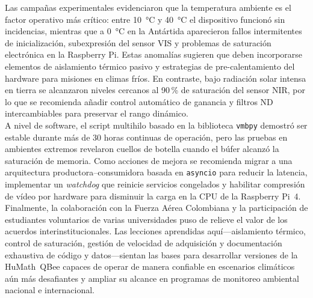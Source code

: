     \noindent Las campañas experimentales evidenciaron que la temperatura ambiente es el factor operativo más crítico: entre 10~\si{\celsius} y 40~\si{\celsius} el dispositivo funcionó sin incidencias, mientras que a 0~\si{\celsius} en la Antártida aparecieron fallos intermitentes de inicialización, subexpresión del sensor VIS y problemas de saturación electrónica en la Raspberry Pi. Estas anomalías sugieren que deben incorporarse elementos de aislamiento térmico pasivo y estrategias de pre-calentamiento del hardware para misiones en climas fríos. En contraste, bajo radiación solar intensa en tierra se alcanzaron niveles cercanos al 90\,\% de saturación del sensor NIR, por lo que se recomienda añadir control automático de ganancia y filtros ND intercambiables para preservar el rango dinámico.\\


    \noindent A nivel de software, el script multihilo basado en la biblioteca \texttt{vmbpy} demostró ser estable durante más de 30 horas continuas de operación, pero las pruebas en ambientes extremos revelaron cuellos de botella cuando el búfer alcanzó la saturación de memoria. Como acciones de mejora se recomienda migrar a una arquitectura productora--consumidora basada en \texttt{asyncio} para reducir la latencia, implementar un \textit{watchdog} que reinicie servicios congelados y habilitar compresión de vídeo por hardware para disminuir la carga en la CPU de la Raspberry Pi~4.\\

    \noindent Finalmente, la colaboración con la Fuerza Aérea Colombiana y la participación de estudiantes voluntarios de varias universidades puso de relieve el valor de los acuerdos interinstitucionales. Las lecciones aprendidas aquí---aislamiento térmico, control de saturación, gestión de velocidad de adquisición y documentación exhaustiva de código y datos---sientan las bases para desarrollar versiones de la HuMath\textregistered~QBee capaces de operar de manera confiable en escenarios climáticos aún más desafiantes y ampliar su alcance en programas de monitoreo ambiental nacional e internacional.\\

